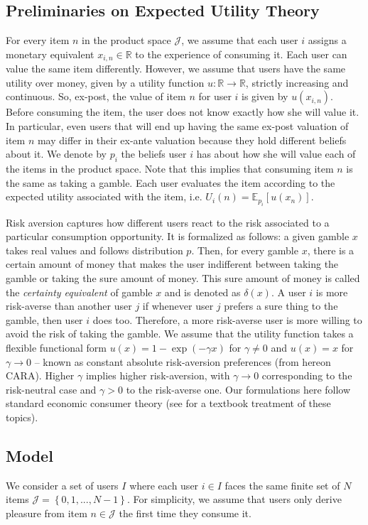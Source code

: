 \documentclass[manuscript, nonacm]{acmart}
\newcommand{\xhdr}[1]{\vspace{1mm} \noindent{\bf #1}}
\begin{document}
\subsection{Preliminaries on Expected Utility Theory}
\noindent For every item $n$ in the product space $\mathcal J$, we assume that each user $i$ assigns a monetary equivalent $x_{i,n} \in \mathbb R$ to the experience of consuming it. Each user can value the same item differently. However, we assume that users have the same utility over money, given by a utility function $u: \mathbb R \to \mathbb R$, strictly increasing and continuous. So, ex-post, the value of item $n$ for user $i$ is given by $u(x_{i,n})$. Before consuming the item, the user does not know exactly how she will value it. In particular, even users that will end up having the same ex-post valuation of item $n$ may differ in their ex-ante valuation because they hold different beliefs about it. We denote by $p_{i}$ the beliefs user $i$ has about how she will value each of the items in the product space. Note that this implies that consuming item $n$ is the same as taking a gamble. Each user evaluates the item according to the expected utility associated with the item, i.e. $U_i(n)=\mathbb E_{p_i}[u(x_n)]$. 
\par
Risk aversion captures how different users react to the risk associated to a particular consumption opportunity. It is formalized as follows: a given gamble $x$ takes real values and follows distribution $p$. Then, for every gamble $x$, there is a certain amount of money that makes the user indifferent between taking the gamble or taking the sure amount of money. This sure amount of money is called the \textit{certainty equivalent} of gamble $x$ and is denoted as $\delta(x)$. A user $i$ is more risk-averse than another user $j$ if whenever user $j$ prefers a sure thing to the gamble, then user $i$ does too. Therefore, a more risk-averse user is more willing to avoid the risk of taking the gamble. We assume that the utility function takes a flexible functional form $u(x)=1-\exp(-\gamma x)$ for $\gamma\ne0$ and $u(x)=x$ for $\gamma\to 0$ -- known as constant absolute risk-aversion preferences (from hereon CARA). Higher $\gamma$ implies higher risk-aversion, with $\gamma \to 0$ corresponding to the risk-neutral case and $\gamma>0$ to the risk-averse one. Our formulations here follow standard economic consumer theory (see \cite{mas1995microeconomic} for a textbook treatment of these topics).
\par

\subsection{Model}
\par
\xhdr{Users.} We consider a set of users $I$ where each user $i \in I$ faces the same finite set of $N$ items $\mathcal J = \left\{0,1,...,N-1\right\}$. For simplicity, we assume that users only derive pleasure from item $n \in \mathcal{J}$ the first time they consume it.
\par
\end{document}
